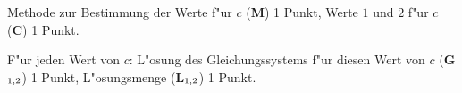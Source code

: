 \begin{bewertung}
\begin{teilaufgaben}
\item
Methode zur Bestimmung der Werte f"ur $c$ ({\bf M}) 1 Punkt,
Werte $1$ und $2$ f"ur $c$ ({\bf C}) 1 Punkt.
\item
F"ur jeden Wert von $c$: L"osung des Gleichungssystems f"ur diesen Wert von $c$ 
({\bf G$\mathstrut_{1,2}$}) 1 Punkt, L"osungsmenge ({\bf L$\mathstrut_{1,2}$})
1 Punkt.
\end{teilaufgaben}
\end{bewertung}

